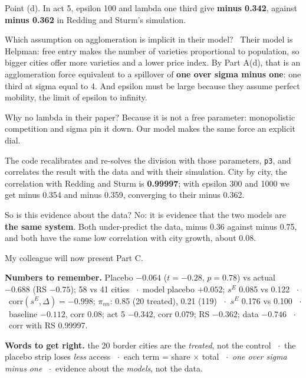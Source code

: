 \begin{say}
 Point (d). In act 5, epsilon 100 and lambda one third give \textbf{minus 0.342}, against \textbf{minus 0.362} in Redding and Sturm's simulation.

 Which assumption on agglomeration is implicit in their model? \pause\ Their model is Helpman: free entry makes the number of varieties proportional to population, so bigger cities offer more varieties and a lower price index. By Part A(d), that is an agglomeration force equivalent to a spillover of \textbf{one over sigma minus one}: one third at sigma equal to 4. And epsilon must be large because they assume perfect mobility, the limit of epsilon to infinity.

 Why no lambda in their paper? Because it is not a free parameter: monopolistic competition and sigma pin it down. Our model makes the same force an explicit dial.

 The code recalibrates and re-solves the division with those parameters, \texttt{p3}, and correlates the result with the data and with their simulation. City by city, the correlation with Redding and Sturm is \textbf{0.99997}; with epsilon 300 and 1000 we get minus 0.354 and minus 0.359, converging to their minus 0.362.

 So is this evidence about the data? No: it is evidence that the two models are \textbf{the same system}. Both under-predict the data, minus 0.36 against minus 0.75, and both have the same low correlation with city growth, about 0.08.

 My colleague will now present Part C.
\end{say}

\vspace{6pt}
\begin{tcolorbox}[colback=tint,colframe=tint,arc=0pt]
\small\textbf{Numbers to remember.} Placebo $-0.064$ ($t=-0.28$, $p=0.78$) vs actual $-0.688$ (RS $-0.75$); 58 vs 41 cities \ $\cdot$\ model placebo $+0.052$; $s^E$ 0.085 vs 0.122 \ $\cdot$\ corr$(s^E,\Delta) = -0.998$; $\pi_{nn}$: 0.85 (20 treated), 0.21 (119) \ $\cdot$\ $s^E$ 0.176 vs 0.100 \ $\cdot$\ baseline $-0.112$, corr 0.08; act 5 $-0.342$, corr 0.079; RS $-0.362$; data $-0.746$ \ $\cdot$\ corr with RS 0.99997.

\textbf{Words to get right.} the 20 border cities are the \emph{treated}, not the control \ $\cdot$\ the placebo strip loses \emph{less} access \ $\cdot$\ each term = share $\times$ total \ $\cdot$\ \emph{one over sigma minus one} \ $\cdot$\ evidence about the \emph{models}, not the data.
\end{tcolorbox}

